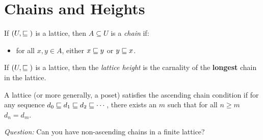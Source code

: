 \section{Chains and Heights}
\begin{definition}[Chain]
  If $(U, \sqsubseteq{})$ is a lattice, then $A \subseteq U$ is a \emph{chain} if:
  \begin{itemize}
  \item for all $x,y \in A$, either $x \sqsubseteq y$ or $y \sqsubseteq x$.
  \end{itemize}
\end{definition}

\begin{definition}[Height]
  If $(U, \sqsubseteq{})$ is a lattice, then the \emph{lattice height} is the carnality of the \textbf{longest} chain in the lattice.
\end{definition}

\begin{definition}
  A lattice (or more generally, a poset) satisfies the ascending chain condition
  if for any sequence $d_0 \sqsubseteq d_1 \sqsubseteq d_2 \sqsubseteq \cdots$, there exists an
  $m$ such that for all $n \geq m$ $d_n = d_m$.
\end{definition}

\emph{Question:} Can you have non-ascending chains in a finite lattice?

